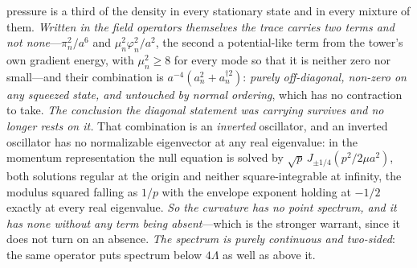 \documentclass[11pt,a4paper]{article}
\theoremstyle{plain}
\theoremstyle{definition}
\theoremstyle{remark}
\begin{document}
pressure is a third of the density in every stationary state and in every mixture of them. \emph{Written in
the field operators themselves the trace carries two terms and not none}---$\pi_n^{2}/a^{6}$ and
$\mu_n^{2}\varphi_n^{2}/a^{2}$, the second a potential-like term from the tower's own gradient energy, with
$\mu_n^{2}\ge8$ for every mode so that it is neither zero nor small---and their combination is
$a^{-4}(a_n^{2}+a_n^{\dagger2})$: \emph{purely off-diagonal, non-zero on any squeezed state, and untouched
by normal ordering}, which has no contraction to take. \emph{The conclusion the diagonal statement was
carrying survives and no longer rests on it.} That combination is an \emph{inverted} oscillator, and an
inverted oscillator has no normalizable eigenvector at any real eigenvalue: in the momentum representation
the null equation is solved by $\sqrt p\,J_{\pm1/4}(p^{2}/2\mu a^{2})$, both solutions regular at the origin
and neither square-integrable at infinity, the modulus squared falling as $1/p$ with the envelope exponent
holding at $-1/2$ exactly at every real eigenvalue. \emph{So the curvature has no point spectrum, and it has
none without any term being absent}---which is the stronger warrant, since it does not turn on an
absence.
\emph{The spectrum is purely continuous and two-sided}: the same operator puts spectrum below $4\Lambda$ as
well as above it.
\end{document}
